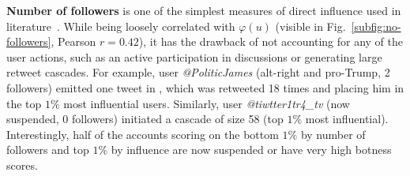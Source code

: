 \textbf{Number of followers} is one of the simplest measures of direct influence used in literature~\cite{Mishra2016,Zhao2015}.
While being loosely correlated with $\varphi(u)$ (visible in Fig.~\ref{subfig:no-followers}, Pearson $r = 0.42$), it has the drawback of not accounting for any of the user actions, such as an active participation in discussions or generating large retweet cascades.
For example, user \textit{@PoliticJames} (alt-right and pro-Trump, 2 followers) emitted one tweet in \debate, which was retweeted 18 times and placing him in the top $1\%$ most influential users.
Similarly, user \textit{@tiwtter1tr4\_tv} (now suspended, 0 followers) initiated a cascade of size 58 (top $1\%$ most influential).
Interestingly, half of the accounts scoring on the bottom $1\%$ by number of followers and top $1\%$ by influence are now suspended or have very high botness scores.

